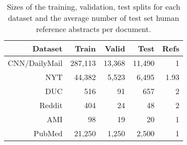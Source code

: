 \begin{table}
 \centering
    \begin{tabular}{ r  r r r r }
      \toprule
      \textbf{Dataset} & \textbf{Train} & \textbf{Valid} & \textbf{Test} &
        \textbf{Refs} \\
      \midrule
      CNN/DailyMail & 287,113 & 13,368 & 11,490 & 1\\
      NYT & 44,382 & 5,523 & 6,495 & 1.93\\
      DUC & 516 & 91 & 657 & 2 \\
      Reddit & 404 & 24 & 48 & 2 \\
      AMI & 98 & 19 & 20 & 1 \\
      PubMed & 21,250 & 1,250 & 2,500 & 1\\
      \bottomrule
    \end{tabular}
   \caption{Sizes of the training, validation, test splits for each dataset
   and the average number of test set human reference abstracts per document.}
   \label{tab:dldata}
\end{table}


